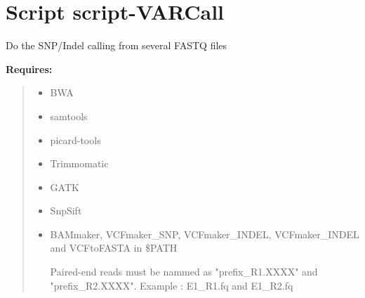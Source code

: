 %
%
%


\section{Script script-VARCall}

    \label{script-VARCall}
Do the SNP/Indel calling from several FASTQ files

\textbf{Requires:}
\begin{quote}
  \begin{itemize}

  \item
    \setlength{\parskip}{0.6ex}
BWA



  \item samtools



  \item picard-tools



  \item Trimmomatic



  \item GATK



  \item SnpSift



  \item BAMmaker, VCFmaker\_SNP, VCFmaker\_INDEL, VCFmaker\_INDEL and VCFtoFASTA in
\$PATH

Paired-end reads must be nammed as "prefix\_R1.XXXX" and "prefix\_R2.XXXX".
Example : E1\_R1.fq and E1\_R2.fq



\end{itemize}

\end{quote}



